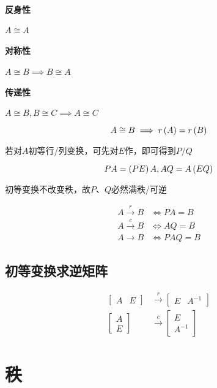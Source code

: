 \documentclass{article}
\begin{document}
\paragraph{反身性}$A\cong A$

\paragraph{对称性}$A\cong B\implies B\cong A$

\paragraph{传递性}$A\cong B,B\cong C\implies A\cong C$

\[A\cong B\implies r\left(A\right)=r\left(B\right)\]

若对$A$初等行/列变换，可先对$E$作，即可得到$P/Q$

\[PA=\left(PE\right)A,AQ=A\left(EQ\right)\]

初等变换不改变秩，故$P$、$Q$必然满秩/可逆

\[\begin{aligned}
        A\overset{r}\to B & \iff PA=B  \\
        A\overset{c}\to B & \iff AQ=B  \\
        A\to B            & \iff PAQ=B
    \end{aligned}\]

\subsection{初等变换求逆矩阵}

\[\begin{aligned}
        \begin{bmatrix}A&E\end{bmatrix}
         & \overset{r}\to
        \begin{bmatrix}E&A^{-1}\end{bmatrix} \\
        \begin{bmatrix}A\\E\end{bmatrix}
         & \overset{c}\to
        \begin{bmatrix}E\\A^{-1}\end{bmatrix}
    \end{aligned}\]

\section{秩}
\end{document}
